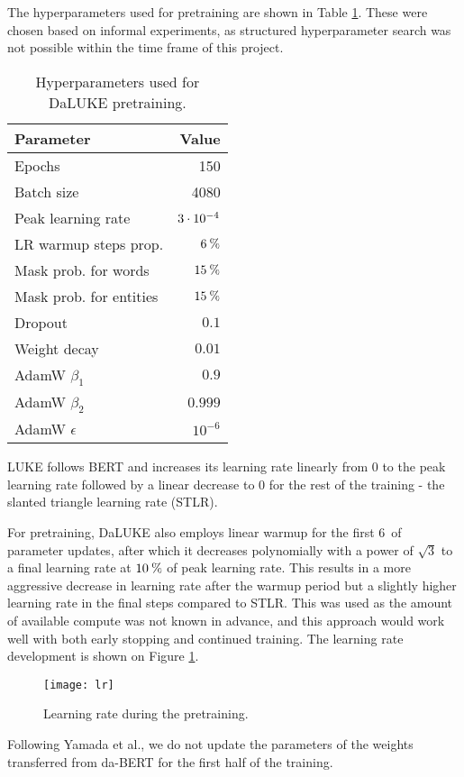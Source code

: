 \documentclass[main.tex]{subfiles}
\begin{document}
The hyperparameters used for pretraining are shown in Table \ref{tab:pretrain-hyper}.
These were chosen based on informal experiments, as structured hyperparameter search was not possible within the time frame of this project.
\begin{table}[H]
    \centering
    \begin{tabular}{l|r}
        Parameter  &    Value\\\hline
        Epochs     & 150\\
        Batch size &    4080\\
        Peak learning rate & $3\cdot10^{-4}$\\
        LR warmup steps prop. & $ 6\:\text{\%{}} $\\
        Mask prob. for words & $ 15\:\text{\%{}} $\\
        Mask prob. for entities & $ 15\:\text{\%{}} $\\
        Dropout & $ 0.1 $\\
        Weight decay & $ 0.01 $\\
        AdamW $ \beta_1 $ & $ 0.9 $\\
        AdamW $ \beta_2 $ & $ 0.999 $\\
        AdamW $ \epsilon $ & $ 10^{-6} $
    \end{tabular}
    \caption{Hyperparameters used for DaLUKE pretraining.}\label{tab:pretrain-hyper}
\end{table}\noindent
LUKE follows BERT and increases its learning rate linearly from 0 to the peak learning rate followed by a linear decrease to 0 for the rest of the training - the slanted triangle learning rate (STLR). \cite{devlin2019bert, yamada2020luke, howardruder2018universal}

For pretraining, DaLUKE also employs linear warmup for the first 6\pro\ of parameter updates, after which it decreases polynomially with a power of $ \sqrt{3} $ to a final learning rate at $10\:\text{\%{}}$ of peak learning rate.
This results in a more aggressive decrease in learning rate after the warmup period but a slightly higher learning rate in the final steps compared to STLR.
This was used as the amount of available compute was not known in advance, and this approach would work well with both early stopping and continued training.
The learning rate development is shown on Figure \ref{fig:lr}.

\begin{figure}[H]
    \centering
    \texttt{[image: lr]}
    \caption{Learning rate during the pretraining.}
    \label{fig:lr}
\end{figure}\noindent
Following Yamada et al., we do not update the parameters of the weights transferred from da-BERT for the first half of the training.
\end{document}
